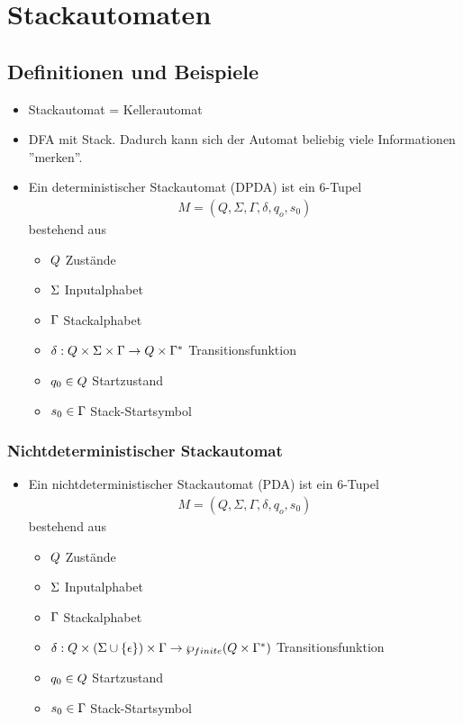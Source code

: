 \documentclass{scrartcl}
\begin{document}
\pagebreak
\section{Stackautomaten}

\subsection{Definitionen und Beispiele}

\begin{itemize}
	\item Stackautomat = Kellerautomat
	\item DFA mit Stack. Dadurch kann sich der Automat beliebig viele Informationen ''merken''.
	\item Ein deterministischer Stackautomat (DPDA) ist ein 6-Tupel
	\begin{align*}
		M = (Q,\Sigma,\Gamma,\delta,q_o,s_0)
	\end{align*}
	bestehend aus
	\begin{itemize}
		\item $Q \hfill$ Zustände
		\item $\Sigma \hfill$ Inputalphabet
		\item $\Gamma \hfill$ Stackalphabet
		\item $\delta: Q \times \Sigma \times \Gamma \rightarrow Q \times \Gamma^* \hfill$ Transitionsfunktion
		\item $q_0 \in Q \hfill$ Startzustand
		\item $s_0 \in \Gamma \hfill$ Stack-Startsymbol
	\end{itemize}
\end{itemize}

\subsubsection{Nichtdeterministischer Stackautomat}

\begin{itemize}
	\item Ein nichtdeterministischer Stackautomat (PDA) ist ein 6-Tupel
	\begin{align*}
		M = (Q,\Sigma,\Gamma,\delta,q_o,s_0)
	\end{align*}
	bestehend aus
	\begin{itemize}
		\item $Q \hfill$ Zustände
		\item $\Sigma \hfill$ Inputalphabet
		\item $\Gamma \hfill$ Stackalphabet
		\item $\delta: Q \times (\Sigma \cup \{ \epsilon \}) \times \Gamma \rightarrow \wp_{finite}(Q \times \Gamma^*) \hfill$ Transitionsfunktion
		\item $q_0 \in Q \hfill$ Startzustand
		\item $s_0 \in \Gamma \hfill$ Stack-Startsymbol
	\end{itemize}
\end{itemize}
\end{document}

